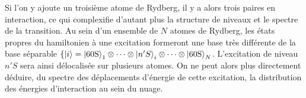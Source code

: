 Si l'on y ajoute un troisième atome de Rydberg, il y a alors trois paires en interaction, ce qui complexifie d'autant plus la structure de niveaux et le spectre de la transition.
Au sein d'un ensemble de $N$ atomes de Rydberg, les états propres du hamiltonien à une excitation formeront une base très différente de la base séparable $\{\ket{i} = 
\ket{\mathrm{60S}}_1\otimes\dots\otimes\ket{n'S}_i\otimes\dots\otimes\ket{\mathrm{60S}}_N$.
L'excitation de niveau $n'S$ sera ainsi délocalisée sur plusieurs atomes.
On ne peut alors plus directement déduire, du spectre des déplacements d'énergie de cette excitation, la distribution des énergies d'interaction au sein du nuage.


